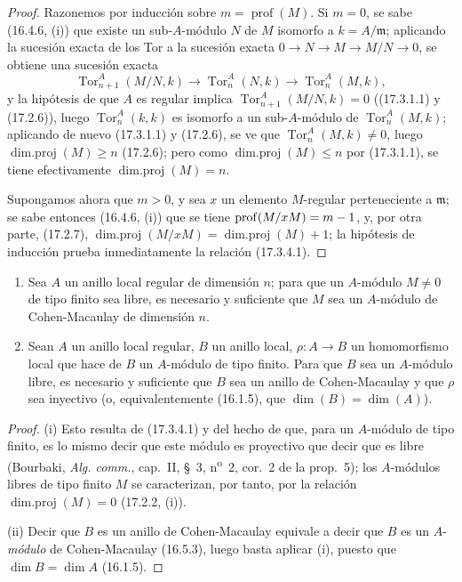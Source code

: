 \begin{proof}
Razonemos por inducción sobre $m=\operatorname{prof}(M)$. Si $m=0$, se sabe
(16.4.6, (i)) que existe un sub-$A$-módulo $N$ de $M$ isomorfo a
$k=A/\mathfrak{m}$; aplicando la sucesión exacta de los Tor a la sucesión
exacta $0\longrightarrow N\longrightarrow M\longrightarrow M/N\longrightarrow0$,
se obtiene una sucesión exacta
\[
  \operatorname{Tor}^A_{n+1}(M/N,k)\longrightarrow
  \operatorname{Tor}^A_n(N,k)\longrightarrow
  \operatorname{Tor}^A_n(M,k),
\]
y la hipótesis de que $A$ es regular implica
$\operatorname{Tor}^A_{n+1}(M/N,k)=0$ ((17.3.1.1) y (17.2.6)), luego
$\operatorname{Tor}^A_n(k,k)$ es isomorfo a un sub-$A$-módulo de
$\operatorname{Tor}^A_n(M,k)$; aplicando de nuevo (17.3.1.1) y (17.2.6), se
ve que $\operatorname{Tor}^A_n(M,k)\neq0$, luego
$\operatorname{dim.proj}(M)\geq n$ (17.2.6); pero como
$\operatorname{dim.proj}(M)\leq n$ por (17.3.1.1), se tiene efectivamente
$\operatorname{dim.proj}(M)=n$.

Supongamos ahora que $m>0$, y sea $x$ un elemento $M$-regular perteneciente a
$\mathfrak{m}$; se sabe entonces (16.4.6, (i)) que se tiene
$\operatorname{prof}(M/xM)=m- 1$, y, por otra parte, (17.2.7),
$\operatorname{dim.proj}(M/xM)=\operatorname{dim.proj}(M)+1$; la hipótesis de
inducción prueba inmediatamente la relación (17.3.4.1).
\end{proof}


\begin{corollary}[17.3.5]
\label{0.17.3.5-fr}
\begin{enumerate}
  \item[\rm(i)] Sea $A$ un anillo local regular de dimensión $n$; para que un
  $A$-módulo $M\neq0$ de tipo finito sea libre, es necesario y suficiente que
  $M$ sea un $A$-módulo de Cohen-Macaulay de dimensión $n$.
  \item[\rm(ii)] Sean $A$ un anillo local regular, $B$ un anillo local,
  $\rho:A\to B$ un homomorfismo local que hace de $B$ un $A$-módulo de tipo
  finito. Para que $B$ sea un $A$-módulo libre, es necesario y suficiente que
  $B$ sea un anillo de Cohen-Macaulay y que $\rho$ sea inyectivo \textup{(o,
  equivalentemente (16.1.5), que $\dim(B)=\dim(A)$)}.
\end{enumerate}
\end{corollary}

\begin{proof}
(i) Esto resulta de (17.3.4.1) y del hecho de que, para un $A$-módulo de tipo
finito, es lo mismo decir que este módulo es proyectivo que decir que es libre
(Bourbaki, \emph{Alg. comm.}, cap.~II, \S~3, n\textsuperscript{o}~2, cor.~2 de
la prop.~5); los $A$-módulos libres de tipo finito $M$ se caracterizan, por
tanto, por la relación $\operatorname{dim.proj}(M)=0$ (17.2.2, (i)).

(ii) Decir que $B$ es un anillo de Cohen-Macaulay equivale a decir que $B$ es
un $A$-\emph{módulo} de Cohen-Macaulay (16.5.3), luego basta aplicar (i), puesto que
$\dim B=\dim A$ (16.1.5).
\end{proof}

